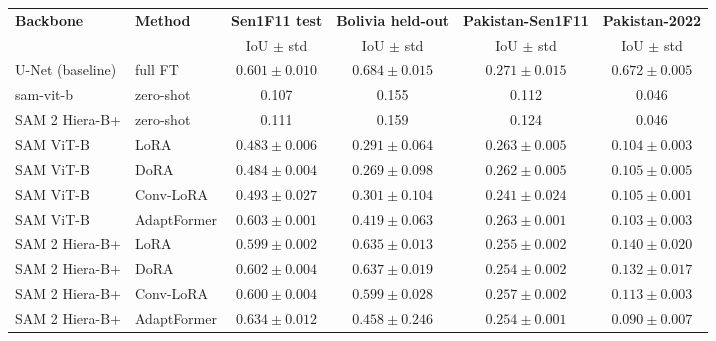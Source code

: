 \begin{tabular}{llcccc}
\toprule
\textbf{Backbone} & \textbf{Method} & \textbf{Sen1F11 test} & \textbf{Bolivia held-out} & \textbf{Pakistan-Sen1F11} & \textbf{Pakistan-2022} \\
                  &                & IoU $\pm$ std         & IoU $\pm$ std            & IoU $\pm$ std            & IoU $\pm$ std         \\
\midrule
U-Net (baseline) & full FT & $0.601 \pm 0.010$ & $0.684 \pm 0.015$ & $0.271 \pm 0.015$ & $0.672 \pm 0.005$ \\
sam-vit-b & zero-shot & 0.107 & 0.155 & 0.112 & 0.046 \\
SAM 2 Hiera-B+ & zero-shot & 0.111 & 0.159 & 0.124 & 0.046 \\
SAM ViT-B & LoRA & $0.483 \pm 0.006$ & $0.291 \pm 0.064$ & $0.263 \pm 0.005$ & $0.104 \pm 0.003$ \\
SAM ViT-B & DoRA & $0.484 \pm 0.004$ & $0.269 \pm 0.098$ & $0.262 \pm 0.005$ & $0.105 \pm 0.005$ \\
SAM ViT-B & Conv-LoRA & $0.493 \pm 0.027$ & $0.301 \pm 0.104$ & $0.241 \pm 0.024$ & $0.105 \pm 0.001$ \\
SAM ViT-B & AdaptFormer & $0.603 \pm 0.001$ & $0.419 \pm 0.063$ & $0.263 \pm 0.001$ & $0.103 \pm 0.003$ \\
SAM 2 Hiera-B+ & LoRA & $0.599 \pm 0.002$ & $0.635 \pm 0.013$ & $0.255 \pm 0.002$ & $0.140 \pm 0.020$ \\
SAM 2 Hiera-B+ & DoRA & $0.602 \pm 0.004$ & $0.637 \pm 0.019$ & $0.254 \pm 0.002$ & $0.132 \pm 0.017$ \\
SAM 2 Hiera-B+ & Conv-LoRA & $0.600 \pm 0.004$ & $0.599 \pm 0.028$ & $0.257 \pm 0.002$ & $0.113 \pm 0.003$ \\
SAM 2 Hiera-B+ & AdaptFormer & $0.634 \pm 0.012$ & $0.458 \pm 0.246$ & $0.254 \pm 0.001$ & $0.090 \pm 0.007$ \\
\bottomrule
\end{tabular}